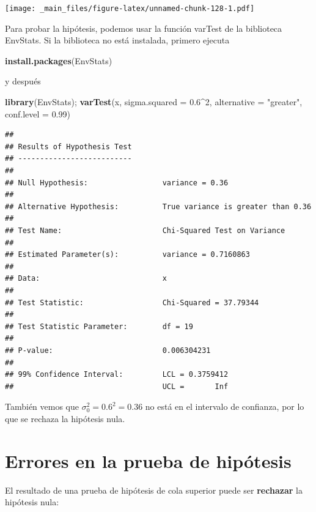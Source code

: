 \documentclass[
]{book}
\newenvironment{Shaded}{\begin{snugshade}}{\end{snugshade}}
\newcommand{\AttributeTok}[1]{\textcolor[rgb]{0.13,0.29,0.53}{#1}}
\newcommand{\DecValTok}[1]{\textcolor[rgb]{0.00,0.00,0.81}{#1}}
\newcommand{\FloatTok}[1]{\textcolor[rgb]{0.00,0.00,0.81}{#1}}
\newcommand{\FunctionTok}[1]{\textcolor[rgb]{0.13,0.29,0.53}{\textbf{#1}}}
\newcommand{\NormalTok}[1]{#1}
\newcommand{\SpecialCharTok}[1]{\textcolor[rgb]{0.81,0.36,0.00}{\textbf{#1}}}
\newcommand{\StringTok}[1]{\textcolor[rgb]{0.31,0.60,0.02}{#1}}
\begin{document}
\texttt{[image: \_main\_files/figure-latex/unnamed-chunk-128-1.pdf]}

Para probar la hipótesis, podemos usar la función varTest de la biblioteca EnvStats. Si la biblioteca no está instalada, primero ejecuta

\begin{Shaded}
\begin{Highlighting}[]
\FunctionTok{install.packages}\NormalTok{(EnvStats)}
\end{Highlighting}
\end{Shaded}

y después

\begin{Shaded}
\begin{Highlighting}[]
\FunctionTok{library}\NormalTok{(EnvStats);}
\FunctionTok{varTest}\NormalTok{(x, }\AttributeTok{sigma.squared =} \FloatTok{0.6}\SpecialCharTok{\^{}}\DecValTok{2}\NormalTok{, }\AttributeTok{alternative =} \StringTok{"greater"}\NormalTok{, }\AttributeTok{conf.level =} \FloatTok{0.99}\NormalTok{) }
\end{Highlighting}
\end{Shaded}

\begin{verbatim}
## 
## Results of Hypothesis Test
## --------------------------
## 
## Null Hypothesis:                 variance = 0.36
## 
## Alternative Hypothesis:          True variance is greater than 0.36
## 
## Test Name:                       Chi-Squared Test on Variance
## 
## Estimated Parameter(s):          variance = 0.7160863
## 
## Data:                            x
## 
## Test Statistic:                  Chi-Squared = 37.79344
## 
## Test Statistic Parameter:        df = 19
## 
## P-value:                         0.006304231
## 
## 99% Confidence Interval:         LCL = 0.3759412
##                                  UCL =       Inf
\end{verbatim}

También vemos que \(\sigma_0^2=0.6^2=0.36\) no está en el intervalo de confianza, por lo que se rechaza la hipótesis nula.

\hypertarget{errores-en-la-prueba-de-hipuxf3tesis}{%
\section{Errores en la prueba de hipótesis}\label{errores-en-la-prueba-de-hipuxf3tesis}}

El resultado de una prueba de hipótesis de cola superior puede ser \textbf{rechazar} la hipótesis nula:
\end{document}
